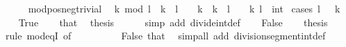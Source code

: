 \begin{isabellebody}
\ \ \ \ \isamarkupfalse%
\isanewline
{}\isamarkupfalse%
%
\endisatagproof
{\isafoldproof}%
%
\isadelimproof
\isanewline
%
\endisadelimproof
\isanewline
{}\isamarkupfalse%
\ mod{\isacharunderscore}{\kern0pt}pos{\isacharunderscore}{\kern0pt}neg{\isacharunderscore}{\kern0pt}trivial{\isacharcolon}{\kern0pt}\isanewline
\ \ {\isachardoublequoteopen}k\ mod\ l\ {\isacharequal}{\kern0pt}\ k\ {\isacharplus}{\kern0pt}\ l{\isachardoublequoteclose}\ \ {\isachardoublequoteopen}{}\ {\isacharless}{\kern0pt}\ k{\isachardoublequoteclose}\ \ {\isachardoublequoteopen}k\ {\isacharplus}{\kern0pt}\ l\ {\isasymle}\ {}{\isachardoublequoteclose}\ \ k\ l\ {\isacharcolon}{\kern0pt}{\isacharcolon}{\kern0pt}\ int\isanewline
%
\isadelimproof
%
\endisadelimproof
%
\isatagproof
{}\isamarkupfalse%
\ {\isacharparenleft}{\kern0pt}cases\ {\isacartoucheopen}l\ {\isacharequal}{\kern0pt}\ {\isacharminus}{\kern0pt}\ k{\isacartoucheclose}{\isacharparenright}{\kern0pt}\isanewline
\ \ \isamarkupfalse%
\ True\isanewline
\ \ \isamarkupfalse%
\ that\ \isamarkupfalse%
\ {\isacharquery}{\kern0pt}thesis\isanewline
\ \ \ \ \isamarkupfalse%
\ {\isacharparenleft}{\kern0pt}simp\ add{\isacharcolon}{\kern0pt}\ divide{\isacharunderscore}{\kern0pt}int{\isacharunderscore}{\kern0pt}def{\isacharparenright}{\kern0pt}\isanewline
{}\isamarkupfalse%
\isanewline
\ \ \isamarkupfalse%
\ False\isanewline
\ \ \isamarkupfalse%
\ {\isacharquery}{\kern0pt}thesis\isanewline
\ \ \ \ \isamarkupfalse%
\ {\isacharparenleft}{\kern0pt}rule\ mod{\isacharunderscore}{\kern0pt}eqI\ {\isacharbrackleft}{\kern0pt}of\ {\isacharunderscore}{\kern0pt}\ {\isacharunderscore}{\kern0pt}\ {\isacartoucheopen}{\isacharminus}{\kern0pt}\ {}{\isacartoucheclose}{\isacharbrackright}{\kern0pt}{\isacharparenright}{\kern0pt}\isanewline
\ \ \ \ \isamarkupfalse%
\ False\ that\ \isamarkupfalse%
\ {\isacharparenleft}{\kern0pt}simp{\isacharunderscore}{\kern0pt}all\ add{\isacharcolon}{\kern0pt}\ division{\isacharunderscore}{\kern0pt}segment{\isacharunderscore}{\kern0pt}int{\isacharunderscore}{\kern0pt}def{\isacharparenright}{\kern0pt}\isanewline
\ \ \ \ \isamarkupfalse%
\isanewline
{}\isamarkupfalse%
%
\endisatagproof
{\isafoldproof}%
%
\isadelimproof
%
\endisadelimproof
%
\begin{isamarkuptext}%

\end{isamarkuptext}
\end{isabellebody}
